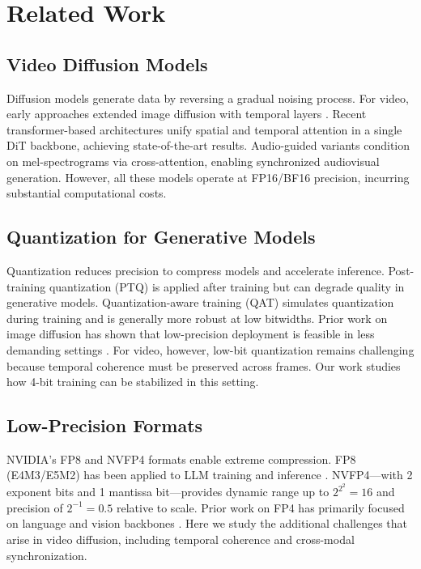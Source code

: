 \documentclass[journal,twoside]{IEEEtran}
\theoremstyle{definition}
\theoremstyle{remark}
\begin{document}
\section{Related Work}
\label{sec:related}

\subsection{Video Diffusion Models}
Diffusion models \cite{ho2020denoising, song2021denoising} generate data by reversing a gradual noising process. For video, early approaches extended image diffusion with temporal layers \cite{ho2022video, yang2022latent}. Recent transformer-based architectures \cite{peebles2023scalable, ma2024latte} unify spatial and temporal attention in a single DiT backbone, achieving state-of-the-art results. Audio-guided variants \cite{zhu2023tune, guo2024audio} condition on mel-spectrograms via cross-attention, enabling synchronized audiovisual generation. However, all these models operate at FP16/BF16 precision, incurring substantial computational costs.

\subsection{Quantization for Generative Models}
Quantization reduces precision to compress models and accelerate inference. Post-training quantization (PTQ) \cite{bondarenko2024understanding, xiao2023smoothquant} is applied after training but can degrade quality in generative models. Quantization-aware training (QAT) \cite{esser2020learned, liu2020lsq} simulates quantization during training and is generally more robust at low bitwidths. Prior work on image diffusion has shown that low-precision deployment is feasible in less demanding settings \cite{li2023efficientdm}. For video, however, low-bit quantization remains challenging because temporal coherence must be preserved across frames. Our work studies how 4-bit training can be stabilized in this setting.

\subsection{Low-Precision Formats}
NVIDIA's FP8 \cite{nvidia2022fp8} and NVFP4 \cite{nvidia2024nvfp4} formats enable extreme compression. FP8 (E4M3/E5M2) has been applied to LLM training \cite{dettmers2023qlora} and inference \cite{frantar2023gptq}. NVFP4---with 2 exponent bits and 1 mantissa bit---provides dynamic range up to $2^{2^2} = 16$ and precision of $2^{-1} = 0.5$ relative to scale. Prior work on FP4 has primarily focused on language and vision backbones \cite{zhao2023fp4}. Here we study the additional challenges that arise in video diffusion, including temporal coherence and cross-modal synchronization.
\end{document}
